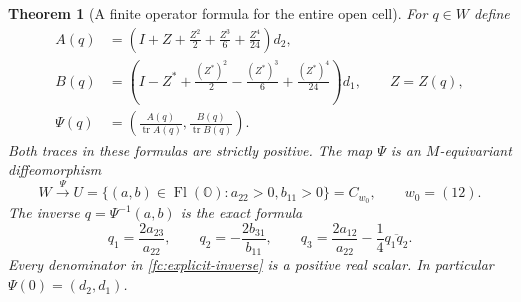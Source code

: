 \documentclass[11pt]{article}
\newtheorem{theorem}{Theorem}[section]
\theoremstyle{definition}
\begin{document}
\begin{theorem}[A finite operator formula for the entire open cell]
\label{fc:open-cell}
For $q\in W$ define
\begin{equation}
 \begin{aligned}
 A(q)&=\left(I+Z+\frac{Z^2}{2}+\frac{Z^3}{6}
                       +\frac{Z^4}{24}\right)d_2,\\
 B(q)&=\left(I-Z^*+\frac{(Z^*)^2}{2}-\frac{(Z^*)^3}{6}
                       +\frac{(Z^*)^4}{24}\right)d_1,
       \qquad Z=Z(q),\\
 \Psi(q)&=\left(\frac{A(q)}{\operatorname{tr}A(q)},
               \frac{B(q)}{\operatorname{tr}B(q)}\right).
 \end{aligned}
 \label{fc:explicit-chart}
\end{equation}
Both traces in these formulas are strictly positive. The map $\Psi$
is an $M$-equivariant diffeomorphism
\begin{equation}
 W\xrightarrow{\ \Psi\ }
 U=\{(a,b)\in\operatorname{Fl}(\mathbb O):a_{22}>0, b_{11}>0\}
   =C_{w_0},\qquad w_0=(12).
 \label{fc:open-cell-locus}
\end{equation}
The inverse $q=\Psi^{-1}(a,b)$ is the exact formula
\begin{equation}
 \boxed{\quad
 q_1=\frac{2a_{23}}{a_{22}},\qquad
 q_2=-\frac{2b_{31}}{b_{11}},\qquad
 q_3=\frac{2a_{12}}{a_{22}}-\frac14\overline{q_1q_2}.
 \quad}
 \label{fc:explicit-inverse}
\end{equation}
Every denominator in \eqref{fc:explicit-inverse} is a positive
real scalar. In particular $\Psi(0)=(d_2,d_1)$.
\end{theorem}
\end{document}
